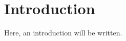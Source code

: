 \clearpage{\thispagestyle{empty}}
\section{Introduction}

	Here, an introduction will be written. \lipsum[5-7]